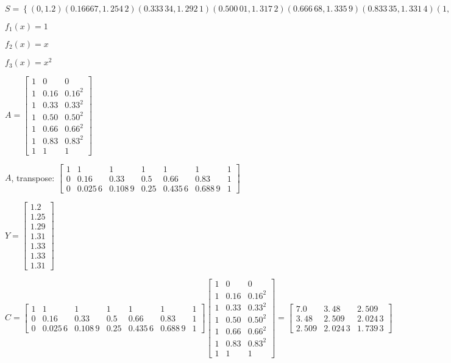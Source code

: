 \documentclass{article}
\begin{document}
\bigskip $S=\left\{ (0,1.2)(0.16667,1.\,\allowbreak
254\,2)(0.333\,34,1.\,\allowbreak 292\,1)(0.500\,01,1.\,\allowbreak
317\,2)(\allowbreak 0.666\,68,\allowbreak 1.\,\allowbreak
335\,9)(0.833\,35,\allowbreak 1.\,\allowbreak 331\,4)(1,1.\,\allowbreak
318\,1)\right\} $

$f_{1}(x)=1$

$f_{2}(x)=x$

$f_{3}(x)=x^{2}$

\bigskip $A=\left[ 
\begin{array}{ccc}
1 & 0 & 0 \\ 
1 & 0.16 & 0.16^{2} \\ 
1 & 0.33 & 0.33^{2} \\ 
1 & 0.50 & 0.50^{2} \\ 
1 & 0.66 & 0.66^{2} \\ 
1 & 0.83 & 0.83^{2} \\ 
1 & 1 & 1%
\end{array}%
\right] $

$A$, transpose: $\left[ 
\begin{array}{ccccccc}
1 & 1 & 1 & 1 & 1 & 1 & 1 \\ 
0 & 0.16 & 0.33 & 0.5 & 0.66 & 0.83 & 1 \\ 
0 & 0.025\,6 & 0.108\,9 & 0.25 & 0.435\,6 & 0.688\,9 & 1%
\end{array}%
\right] \allowbreak $

$Y=\left[ 
\begin{array}{c}
1.2 \\ 
1.25 \\ 
1.29 \\ 
1.31 \\ 
1.33 \\ 
1.33 \\ 
1.31%
\end{array}%
\right] $

$C=\left[ 
\begin{array}{ccccccc}
1 & 1 & 1 & 1 & 1 & 1 & 1 \\ 
0 & 0.16 & 0.33 & 0.5 & 0.66 & 0.83 & 1 \\ 
0 & 0.025\,6 & 0.108\,9 & 0.25 & 0.435\,6 & 0.688\,9 & 1%
\end{array}%
\right] \left[ 
\begin{array}{ccc}
1 & 0 & 0 \\ 
1 & 0.16 & 0.16^{2} \\ 
1 & 0.33 & 0.33^{2} \\ 
1 & 0.50 & 0.50^{2} \\ 
1 & 0.66 & 0.66^{2} \\ 
1 & 0.83 & 0.83^{2} \\ 
1 & 1 & 1%
\end{array}%
\right] =\allowbreak \left[ 
\begin{array}{ccc}
7.0 & 3.\,\allowbreak 48 & 2.\,\allowbreak 509 \\ 
3.\,\allowbreak 48 & 2.\,\allowbreak 509 & 2.\,\allowbreak 024\,3 \\ 
2.\,\allowbreak 509 & 2.\,\allowbreak 024\,3 & 1.\,\allowbreak 739\,3%
\end{array}%
\right] \allowbreak $
\end{document}

